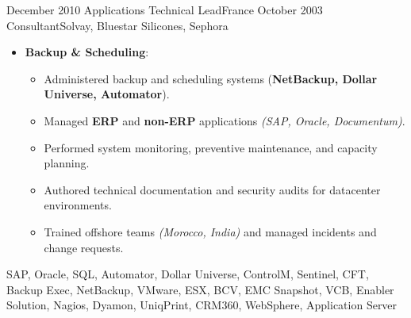 \begin{experiences}
\emptySeparator

\consultantexperience
    {December 2010} {Applications Technical Lead}{}{France}
    {October 2003}    {Consultant}{Solvay, Bluestar Silicones, Sephora} {
        \begin{itemize}[left=0pt,label={},itemsep=0.5em]

          \item \textbf{Backup \& Scheduling}:
            \begin{itemize}[itemsep=0.2em,topsep=0.2em,parsep=0pt]
              \small
              \item Administered backup and scheduling systems (\textbf{NetBackup, Dollar Universe, Automator}).
              \item Managed \textbf{ERP} and \textbf{non-ERP} applications \emph{(SAP, Oracle, Documentum)}.
              \item Performed system monitoring, preventive maintenance, and capacity planning.
              \item Authored technical documentation and security audits for datacenter environments.
              \item Trained offshore teams \emph{(Morocco, India)} and managed incidents and change requests.
            \end{itemize}

        \end{itemize}
    }
    {SAP, Oracle, SQL, Automator, Dollar Universe, ControlM, Sentinel, CFT, Backup Exec, NetBackup, VMware, ESX, BCV, EMC Snapshot, VCB, Enabler Solution, Nagios, Dyamon, UniqPrint, CRM360, WebSphere, Application Server}

\emptySeparator
\end{experiences}
